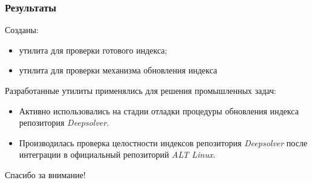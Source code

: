 \documentclass{beamer}
\begin{document}
\begin{frame}
\frametitle{Результаты}
Созданы:
\begin{itemize}
\item
утилита для проверки готового индекса;
\item
утилита для проверки механизма обновления индекса
\end{itemize}


Разработанные утилиты применялись для решения промышленных задач:
\begin{itemize}
\item
Активно использовались на стадии отладки процедуры обновления индекса репозитория \textit{Deepsolver}.
\item
Производилась проверка целостности индексов репозитория \textit{Deepsolver} после интеграции в официальный репозиторий
\textit{ALT Linux}.

\end{itemize}
\end{frame}

\begin{frame}
{\Large Спасибо за внимание!}
\end{frame}
\end{document}
